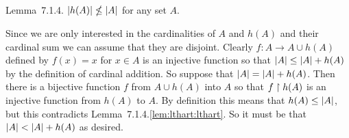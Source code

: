 \def\ex{7.1.4}
\setcounter{itm}{0}
\question{\ex}

\begin{solution}
    \begin{statement}{Lemma~\ex.}
    $\left| h(A) \right| \nleq \left| A \right|$ for any set $A$.
    \end{statement}


    \mainprob
    
	Since we are only interested in the cardinalities of $A$ and $h(A)$ and their cardinal sum we can assume that they are disjoint.
    Clearly $f: A \to A \cup h(A)$ defined by $f(x) = x$ for $x \in A$ is an injective function so that $\left| A \right| \leq \left| A \right| + h(A)$ by the definition of cardinal addition.
    So suppose that $\left| A \right| = \left| A \right| + h(A)$.
    Then there is a bijective function $f$ from $A \cup h(A)$ into $A$ so that $f \restriction h(A)$ is an injective function from $h(A)$ to $A$.
    By definition this means that $h(A) \leq \left| A \right|$, but this contradicts Lemma~\ex.\ref{lem:lthart:lthart}.
    So it must be that $\left| A \right| < \left| A \right| + h(A)$ as desired. \qedsymbol
\end{solution}


